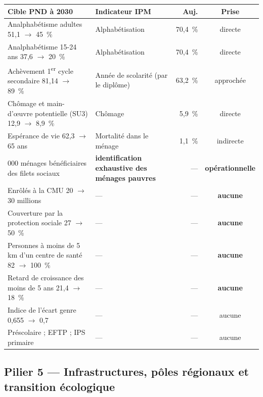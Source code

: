 \documentclass[11pt,a4paper]{article}
\begin{document}
\begin{center}
\small
\begin{tabular}{@{}>{\RaggedRight}p{5.3cm}>{\RaggedRight}p{4.6cm}rc@{}}
\toprule
\textbf{Cible PND à 2030} & \textbf{Indicateur IPM} & \textbf{Auj.} & \textbf{Prise} \\
\midrule
Analphabétisme adultes 51,1 $\to$ 45~\% & Alphabétisation & 70,4~\% & directe \\
Analphabétisme 15-24 ans 37,6 $\to$ 20~\% & Alphabétisation & 70,4~\% & directe \\
Achèvement 1\textsuperscript{er} cycle secondaire
  81,14 $\to$ 89~\% & Année de scolarité (par le diplôme) & 63,2~\% & approchée \\
Chômage et main-d'œuvre potentielle (SU3) 12,9 $\to$ 8,9~\% & Chômage & 5,9~\% & directe \\
Espérance de vie 62,3 $\to$ 65 ans & Mortalité dans le ménage & 1,1~\% & indirecte \\
827 000 ménages bénéficiaires des filets sociaux &
  \textbf{identification exhaustive des ménages pauvres} & --- & \textbf{opérationnelle} \\
Enrôlés à la CMU 20 $\to$ 30 millions & --- & --- & \textbf{aucune} \\
Couverture par la protection sociale 27 $\to$ 50~\% & --- & --- & \textbf{aucune} \\
Personnes à moins de 5 km d'un centre de santé 82 $\to$ 100~\% & --- & --- & \textbf{aucune} \\
Retard de croissance des moins de 5 ans 21,4 $\to$ 18~\% & --- & --- & \textbf{aucune} \\
Indice de l'écart genre 0,655 $\to$ 0,7 & --- & --- & aucune \\
Préscolaire ; EFTP ; IPS primaire & --- & --- & aucune \\
\bottomrule
\end{tabular}
\end{center}

\subsection{Pilier 5 --- Infrastructures, pôles régionaux et transition écologique}
\end{document}

